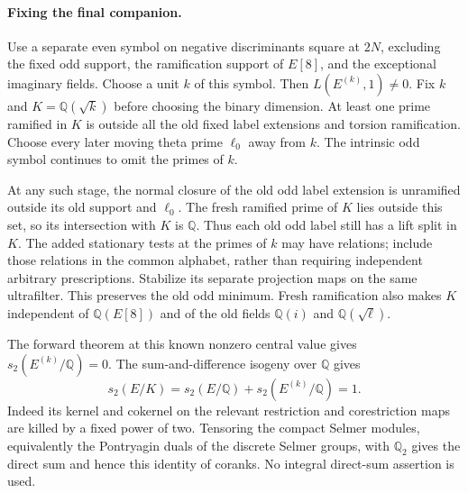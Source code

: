 \documentclass[11pt]{article}
\theoremstyle{definition}
\theoremstyle{remark}
\newcommand{\Q}{\mathbb Q}
\begin{document}
\paragraph{Fixing the final companion.}
Use a separate even symbol on negative discriminants square at $2N$,
excluding the fixed odd support, the ramification support of $E[8]$,
and the exceptional imaginary fields. Choose a unit $k$ of this
symbol. Then $L(E^{(k)},1)\ne0$. Fix $k$ and $K=\Q(\sqrt{k})$
before choosing the binary dimension. At least one prime ramified
in $K$ is outside all the old fixed label extensions and torsion
ramification. Choose every later moving theta prime $\ell_0$ away
from $k$. The intrinsic odd symbol continues to omit the primes of $k$.

At any such stage, the normal closure of the old odd label extension
is unramified outside its old support and $\ell_0$. The fresh ramified
prime of $K$ lies outside this set, so its intersection with $K$ is
$\Q$. Thus each old odd label still has a lift split in $K$.
The added stationary tests at the primes of $k$ may have relations;
include those relations in the common alphabet, rather than requiring
independent arbitrary prescriptions. Stabilize its separate projection
maps on the same ultrafilter. This preserves the old odd minimum.
Fresh ramification also makes $K$ independent of $\Q(E[8])$ and of
the old fields $\Q(i)$ and $\Q(\sqrt{\ell})$.

The forward theorem at this known nonzero central value gives
$s_2(E^{(k)}/\Q)=0$. The sum-and-difference isogeny over $\Q$ gives
\[
 s_2(E/K)=s_2(E/\Q)+s_2(E^{(k)}/\Q)=1.
\]
Indeed its kernel and cokernel on the relevant restriction and
corestriction maps are killed by a fixed power of two. Tensoring the
compact Selmer modules, equivalently the Pontryagin duals of the discrete
Selmer groups, with $\Q_2$ gives the direct sum and hence this identity
of coranks.
No integral direct-sum assertion is used.
\end{document}
